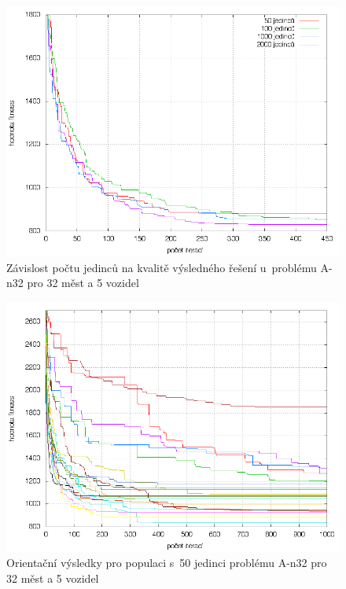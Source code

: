 \documentclass[a4paper]{article}
\begin{document}
\begin{figure}
\centering
\includegraphics[width=\textwidth]{populace.png}
\caption{Závislost počtu jedinců na kvalitě výsledného řešení u~problému A-n32 pro 32 měst a 5 vozidel\label{fig:populace}}
\end{figure}

\begin{figure}
\centering
\includegraphics[width=\textwidth]{padesat.png}
\caption{Orientační výsledky pro populaci s~50 jedinci problému A-n32 pro 32 měst a 5 vozidel\label{fig:padesat}}
\end{figure}
\end{document}
